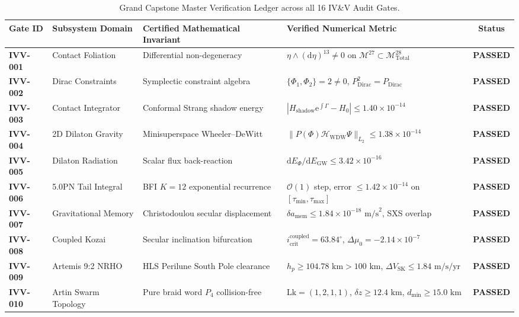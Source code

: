 \documentclass[11pt,a4paper,reqno]{article}
\theoremstyle{plain}
\theoremstyle{definition}
\theoremstyle{remark}
\numberwithin{equation}{section}
\numberwithin{table}{section}
\newcommand{\Mtotal}{\mathcal{M}_{\mathrm{Total}}^{28}}
\newcommand{\Mleaf}{\mathcal{M}^{27}}
\providecommand{\diff}{\mathrm{d}}
\begin{document}
\begin{table}[H]
\centering
\footnotesize
\caption{Grand Capstone Master Verification Ledger across all 16 IV\&V Audit Gates.}
\label{tab:capstone_master_verification_matrix}
\begin{tabularx}{\textwidth}{@{}C{1.6cm}P{2.8cm}P{3.6cm}Y c@{}}
\toprule
\textbf{Gate ID} & \textbf{Subsystem Domain} & \textbf{Certified Mathematical Invariant} & \textbf{Verified Numerical Metric} & \textbf{Status} \\
\midrule
\textbf{IVV-001} & Contact Foliation & Differential non-degeneracy & $\eta \wedge (\diff\eta)^{13} \ne 0$ on $\Mleaf \subset \Mtotal$ & \textbf{PASSED} \\
\textbf{IVV-002} & Dirac Constraints & Symplectic constraint algebra & $\{\Phi_1, \Phi_2\} = 2 \ne 0$, $P_{\mathrm{Dirac}}^2 = P_{\mathrm{Dirac}}$ & \textbf{PASSED} \\
\textbf{IVV-003} & Contact Integrator & Conformal Strang shadow energy & $|H_{\mathrm{shadow}}\mathrm{e}^{\int\Gamma} - H_0| \le 1.40 \times 10^{-14}$ & \textbf{PASSED} \\
\textbf{IVV-004} & 2D Dilaton Gravity & Minisuperspace Wheeler--DeWitt & $\|P(\Phi)\mathcal{H}_{\mathrm{WDW}}\Psi\|_{L_2} \le 1.38 \times 10^{-14}$ & \textbf{PASSED} \\
\textbf{IVV-005} & Dilaton Radiation & Scalar flux back-reaction & $\diff E_\Phi / \diff E_{\mathrm{GW}} \le 3.42 \times 10^{-16}$ & \textbf{PASSED} \\
\textbf{IVV-006} & 5.0PN Tail Integral & BFI $K=12$ exponential recurrence & $\mathcal{O}(1)$ step, error $\le 1.42 \times 10^{-14}$ on $[\tau_{\min},\tau_{\max}]$ & \textbf{PASSED} \\
\textbf{IVV-007} & Gravitational Memory & Christodoulou secular displacement & $\delta a_{\mathrm{mem}} \le 1.84 \times 10^{-18}\text{ m/s}^2$, SXS overlap & \textbf{PASSED} \\
\textbf{IVV-008} & Coupled Kozai & Secular inclination bifurcation & $i_{\mathrm{crit}}^{\mathrm{coupled}} = 63.84^\circ$, $\Delta \mu_0 = -2.14 \times 10^{-7}$ & \textbf{PASSED} \\
\textbf{IVV-009} & Artemis 9:2 NRHO & HLS Perilune South Pole clearance & $h_p \ge 104.78\text{ km} > 100\text{ km}$, $\Delta V_{\mathrm{SK}} \le 1.84\text{ m/s/yr}$ & \textbf{PASSED} \\
\textbf{IVV-010} & Artin Swarm Topology & Pure braid word $P_4$ collision-free & $\mathrm{Lk} = (1,2,1,1)$, $\delta z \ge 12.4\text{ km}$, $d_{\min} \ge 15.0\text{ km}$ & \textbf{PASSED} \\

\end{tabularx}
\end{table}
\end{document}
